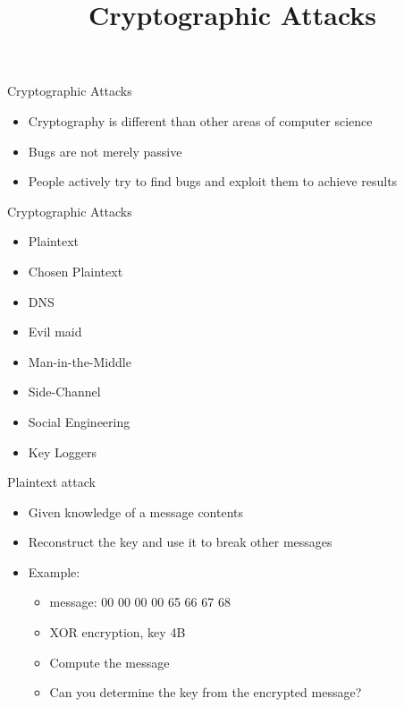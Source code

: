 

\title[]{Cryptographic Attacks}

\begin{frame}
\titlepage
\end{frame}

\begin{withoutheadline}

\begin{frame}{Cryptographic Attacks}
\begin{itemize}
    \item Cryptography is different than other areas of computer science
    \item Bugs are not merely passive
    \item People actively try to find bugs and exploit them to achieve results
\end{itemize}
\end{frame}

\begin{frame}{Cryptographic Attacks}
\begin{itemize}
    \item Plaintext
    \item Chosen Plaintext
    \item DNS
    \item Evil maid
    \item Man-in-the-Middle
    \item Side-Channel
    \item Social Engineering
    \item Key Loggers
\end{itemize}
\end{frame}

\begin{frame}{Plaintext attack}
\begin{itemize}
    \item Given knowledge of a message contents
    \item Reconstruct the key and use it to break other messages
    \item Example:
    \begin{itemize}
        \item message: 00 00 00 00 65 66 67 68
        \item XOR encryption, key 4B
        \item Compute the message
        \item Can you determine the key from the encrypted message?
    \end{itemize}
\end{itemize}
\end{frame}


\end{withoutheadline}
